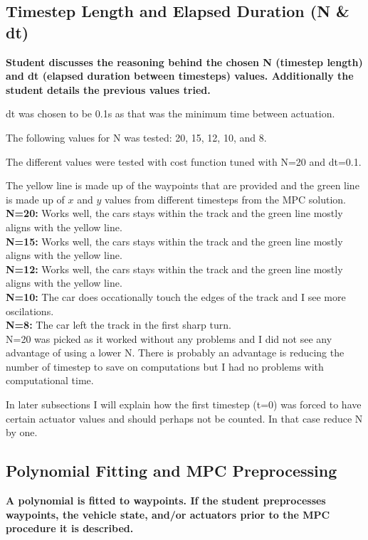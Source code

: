 \documentclass[12pt,a4paper]{article}
\begin{document}
\subsection{Timestep Length and Elapsed Duration (N \& dt)}
\textbf{Student discusses the reasoning behind the chosen N (timestep length) and dt (elapsed duration between timesteps) values. Additionally the student details the previous values tried.}

dt was chosen to be 0.1s as that was the minimum time between actuation. 

The following values for N was tested: 20, 15, 12, 10, and 8.

The different values were tested with cost function tuned with N=20 and dt=0.1.

The yellow line is made up of the waypoints that are provided and the green line is made up of $x$ and $y$ values from different timesteps from the MPC solution. \\

{\bf N=20:} Works well, the cars stays within the track and the green line mostly aligns with the yellow line. \\
{\bf N=15:} Works well, the cars stays within the track and the green line mostly aligns with the yellow line.  \\
{\bf N=12:} Works well, the cars stays within the track and the green line mostly aligns with the yellow line.  \\
{\bf N=10:} The car does occationally touch the edges of the track and I see more oscilations. \\
{\bf N=8:} The car left the track in the first sharp turn. \\

N=20 was picked as it worked without any problems and I did not see any advantage of using a lower N. There is probably an advantage is reducing the number of timestep to save on computations but I had no problems with computational time.

In later subsections I will explain how the first timestep (t=0) was forced to have certain actuator values and should perhaps not be counted. In that case reduce N by one.


\subsection{Polynomial Fitting and MPC Preprocessing}
\textbf{A polynomial is fitted to waypoints. If the student preprocesses waypoints, the vehicle state, and/or actuators prior to the MPC procedure it is described.}
\end{document}
